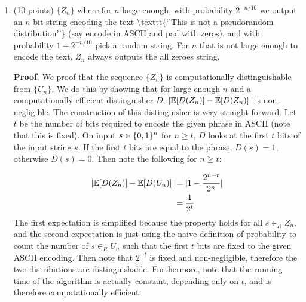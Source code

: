 \documentclass{article}
\begin{document}
\begin{enumerate}[,start=2]
\begin{enumerate}[noitemsep,topsep=\mdcompacttopsep,label=\alph*.]
\item{}(10 points) $\{Z_n \}$ where for $n$ large enough, with probability $2^{-n/10}$ we output an $n$ bit  string encoding the text \textbackslash{}texttt\{\textquoteleft{}'This is not a pseudorandom distribution\textquoteright{}'\} (say encode
in ASCII and pad with zeros), and with probability $1-2^{-n/10}$ pick a random string. For
$n$ that is not large enough to encode the text, $Z_n$ always outputs the all zeroes
string.

\begin{mdbmarginx}{1ex}{0pt}{1ex}{0pt}%
\noindent{}\textbf{Proof}.  We proof that the sequence $\{Z_n\}$ is computationally distinguishable from $\{U_n\}$. We do this by
showing that for large enough $n$ and a computationally efficient distinguisher $D$, 
$|\mathbb{E}[D(Z_n)] - \mathbb{E}[D(Z_n)]|$ is non-negligible. The construction of this distinguisher is very 
straight forward. Let $t$ be the number of bits required to encode the given phrase in 
ASCII (note that this is fixed). On input $s \in \{0,1\}^n$ for $n \geq t$, $D$ looks at the first $t$ bits of the input
string $s$. If the first $t$ bits are equal to the phrase, $D(s) = 1$, otherwise $D(s) = 0$. 
Then note the following for $n \geq t$:%
\end{mdbmarginx}%
\noindent\noindent\[%
\begin{aligned}
| \E[D(Z_n)] - \E[D(U_n)] | &= | 1 - \frac{2^{n-t}}{2^n} | \\
&= \frac{1}{2^t}
\end{aligned}
\]%
The first expectation is simplified because the property holds for all $s \in_R Z_n$, 
and the second expectation is just using the naive definition of probability to count 
the number of $s \in_R U_n$ such that the first $t$ bits are fixed to the given ASCII encoding.
Then note that $2^{-t}$ is fixed and non-negligible, therefore the two distributions are
distinguishable. Furthermore, note that the running time of the algorithm is actually constant,
depending only on $t$, and is therefore computationally efficient. 
\mdfloatright{\ensuremath{\Box}}%
\end{enumerate}%


\end{enumerate}
\end{document}

